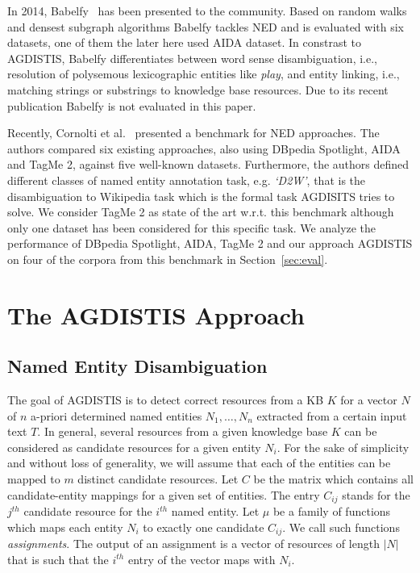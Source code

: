 \documentclass{llncs}
\begin{document}
In 2014, Babelfy~\cite{babelfy} has been presented to the community.
Based on random walks and densest subgraph algorithms Babelfy tackles NED and is evaluated with six datasets, one of them the later here used AIDA dataset. 
In constrast to AGDISTIS, Babelfy differentiates between word sense disambiguation, i.e., resolution of polysemous lexicographic entities like \emph{play}, and entity linking, i.e., matching strings or substrings to knowledge base resources.
Due to its recent publication Babelfy is not evaluated in this paper.

Recently, Cornolti et al.~\cite{Cornolti} presented a benchmark for NED approaches.
The authors compared six existing approaches, also using DBpedia Spotlight, AIDA and TagMe 2, against five well-known datasets. %
Furthermore, the authors defined different classes of named entity annotation task, e.g. \emph{`D2W'}, that is the disambiguation to Wikipedia task which is the formal task AGDISITS tries to solve.
We consider TagMe 2 as state of the art w.r.t. this benchmark although only one dataset has been considered for this specific task.
We analyze the performance of DBpedia Spotlight, AIDA, TagMe 2 and our approach AGDISTIS on four of the corpora from this benchmark in Section~\ref{sec:eval}.

\section{The AGDISTIS Approach} 
\label{sec:approach}

\subsection{Named Entity Disambiguation}
\label{sec:ned}

The goal of AGDISTIS is to detect correct resources from a KB $K$ for a vector $N$ of $n$ a-priori determined named entities $N_1,\ldots,N_n$ extracted from a certain input text $T$.
In general, several resources from a given knowledge base $K$ can be considered as candidate resources for a given entity $N_i$.
For the sake of simplicity and without loss of generality, we will assume that each of the entities can be mapped to $m$ distinct candidate resources.
Let $C$ be the matrix which contains all candidate-entity mappings for a given set of entities.
The entry $C_{ij}$ stands for the $j^{th}$ candidate resource for the $i^{th}$ named entity. 
Let $\mu$ be a family of functions which maps each entity $N_i$ to exactly one candidate $C_{ij}$. 
We call such functions \emph{assignments}.
The output of an assignment is a vector of resources of length $|N|$ that is such that the $i^{th}$ entry of the vector maps with $N_i$.
\end{document}
